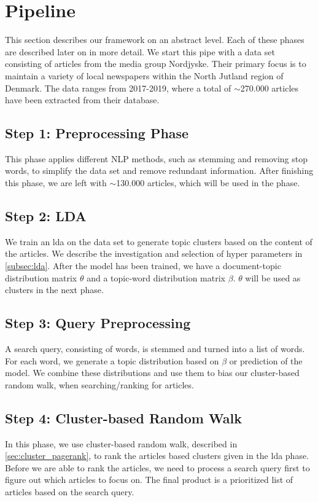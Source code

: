 \section{Pipeline}
This section describes our framework on an abstract level.
Each of these phases are described later on in more detail. 
We start this pipe with a data set consisting of articles from the media group Nordjyske. Their primary focus is to maintain a variety of local newspapers within the North Jutland region of Denmark. 
The data ranges from 2017-2019, where a total of $\sim$270.000 articles have been extracted from their database.

\subsection*{Step 1: Preprocessing Phase}
This phase applies different \gls{NLP} methods, such as stemming and removing stop words, to simplify the data set and remove redundant information.
After finishing this phase, we are left with $\sim$130.000 articles, which will be used in the phase.

\subsection*{Step 2: LDA}
We train an \acrfull{lda} on the data set to generate topic clusters based on the content of the articles. 
We describe the investigation and selection of hyper parameters in \autoref{subsec:lda}. 
After the model has been trained, we have a document-topic distribution matrix $\theta$ and a topic-word distribution matrix $\beta$.
$\theta$ will be used as clusters in the next phase.


\subsection*{Step 3: Query Preprocessing}
A search query, consisting of words, is stemmed and turned into a list of words.
For each word, we generate a topic distribution based on $\beta$ or prediction of the model.
We combine these distributions and use them to bias our cluster-based random walk, when searching/ranking for articles.


\subsection*{Step 4: Cluster-based Random Walk}
In this phase, we use cluster-based random walk, described in \autoref{sec:cluster_pagerank}, to rank the articles based clusters given in the \gls{lda} phase.
Before we are able to rank the articles, we need to process a search query first to figure out which articles to focus on.
The final product is a prioritized list of articles based on the search query.


%
